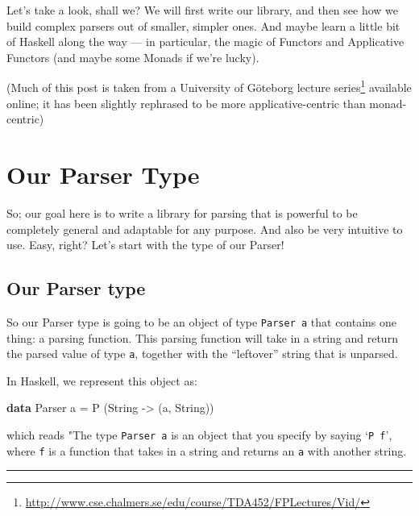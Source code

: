 \documentclass[]{article}
\newenvironment{Shaded}{}{}
\newcommand{\DataTypeTok}[1]{\textcolor[rgb]{0.56,0.13,0.00}{#1}}
\newcommand{\FunctionTok}[1]{\textcolor[rgb]{0.02,0.16,0.49}{#1}}
\newcommand{\KeywordTok}[1]{\textcolor[rgb]{0.00,0.44,0.13}{\textbf{#1}}}
\newcommand{\NormalTok}[1]{#1}
\newcommand{\OtherTok}[1]{\textcolor[rgb]{0.00,0.44,0.13}{#1}}
\renewcommand{\href}[2]{#2\footnote{\url{#1}}}
\begin{document}
Let's take a look, shall we? We will first write our library, and then see how
we build complex parsers out of smaller, simpler ones. And maybe learn a little
bit of Haskell along the way --- in particular, the magic of Functors and
Applicative Functors (and maybe some Monads if we're lucky).

(Much of this post is taken from a University of Göteborg
\href{http://www.cse.chalmers.se/edu/course/TDA452/FPLectures/Vid/}{lecture
series} available online; it has been slightly rephrased to be more
applicative-centric than monad-centric)

\hypertarget{our-parser-type}{%
\section{Our Parser Type}\label{our-parser-type}}

So; our goal here is to write a library for parsing that is powerful to be
completely general and adaptable for any purpose. And also be very intuitive to
use. Easy, right? Let's start with the type of our Parser!

\hypertarget{our-parser-type-1}{%
\subsection{Our Parser type}\label{our-parser-type-1}}

So our Parser type is going to be an object of type \texttt{Parser\ a} that
contains one thing: a parsing function. This parsing function will take in a
string and return the parsed value of type \texttt{a}, together with the
``leftover'' string that is unparsed.

In Haskell, we represent this object as:

\begin{Shaded}
\begin{Highlighting}[]
\KeywordTok{data} \DataTypeTok{Parser}\NormalTok{ a }\FunctionTok{=} \DataTypeTok{P}\NormalTok{ (}\DataTypeTok{String} \OtherTok{->}\NormalTok{ (a, }\DataTypeTok{String}\NormalTok{))}
\end{Highlighting}
\end{Shaded}

which reads "The type \texttt{Parser\ a} is an object that you specify by saying
`\texttt{P\ f}', where \texttt{f} is a function that takes in a string and
returns an \texttt{a} with another string.

\begin{center}\rule{0.5\linewidth}{\linethickness}\end{center}
\end{document}
